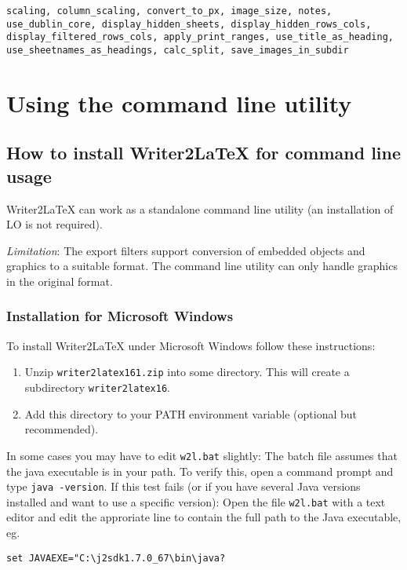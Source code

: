 \documentclass{article}
\newcommand\textstyleSourceText[1]{\texttt{\textmd{#1}}}
\newcommand\liststyleLix{%
\renewcommand\theenumi{\arabic{enumi}}
\renewcommand\theenumii{\arabic{enumii}}
\renewcommand\theenumiii{\arabic{enumiii}}
\renewcommand\theenumiv{\arabic{enumiv}}
\renewcommand\labelenumi{\theenumi.}
\renewcommand\labelenumii{\theenumii.}
\renewcommand\labelenumiii{\theenumiii.}
\renewcommand\labelenumiv{\theenumiv.}
}
\begin{document}
{\mdseries
\textstyleSourceText{scaling, column\_scaling, convert\_to\_px, image\_size, notes, use\_dublin\_core, display\_hidden\_sheets, display\_hidden\_rows\_cols, display\_filtered\_rows\_cols, apply\_print\_ranges, use\_title\_as\_heading, }\textstyleSourceText{use\_sheetnames\_as\_headings, calc\_split, save\_images\_in\_subdir}}

\section{Using the command line utility}
\subsection{How to install Writer2LaTeX for command line usage}
{\mdseries
Writer2LaTeX can work as a standalone command line utility (an installation of LO is not required).}

{\mdseries
\emph{Limitation}: The export filters support conversion of embedded objects and graphics to a suitable format. The command line utility can only handle graphics in the original format.}

\subsubsection{Installation for Microsoft Windows}
{\mdseries
To install Writer2LaTeX under Microsoft Windows follow these instructions:}

\liststyleLix
\begin{enumerate}
\item Unzip \textstyleSourceText{writer2latex161.zip} into some directory. This will create a subdirectory \textstyleSourceText{writer2latex16}.
\item Add this directory to your PATH environment variable (optional but re\-com\-men\-ded).
\end{enumerate}
{\mdseries
In some cases you may have to edit \textstyleSourceText{w2l.bat} slightly: The batch file assumes that the java executable is in your path. To verify this, open a command prompt and type \textstyleSourceText{java -version}.  If this test fails (or if you have several Java versions installed and want to use a specific version): Open the file \textstyleSourceText{w2l.bat} with a text editor and edit the approriate line to contain the full path to the Java executable, eg.}

\begin{verbatim}
set JAVAEXE="C:\j2sdk1.7.0_67\bin\java?
\end{verbatim}
\end{document}
